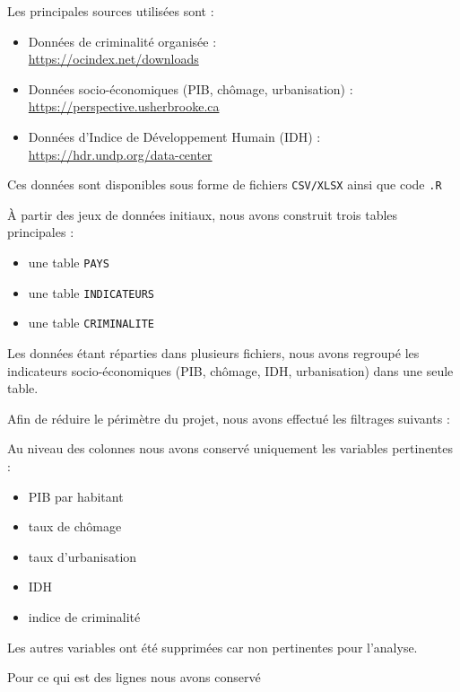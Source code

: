 \documentclass[mstat,12pt]{unswthesis}
\begin{document}
Les principales sources utilisées sont :

\begin{itemize}
\item
  Données de criminalité organisée :\\
  \url{https://ocindex.net/downloads}
\item
  Données socio-économiques (PIB, chômage, urbanisation) :\\
  \url{https://perspective.usherbrooke.ca}
\item
  Données d'Indice de Développement Humain (IDH) :\\
  \url{https://hdr.undp.org/data-center}
\end{itemize}

Ces données sont disponibles sous forme de fichiers \texttt{CSV/XLSX}
ainsi que code \texttt{.R}

\bigskip

À partir des jeux de données initiaux, nous avons construit trois tables
principales :

\begin{itemize}
\item
  une table \texttt{PAYS}
\item
  une table \texttt{INDICATEURS}
\item
  une table \texttt{CRIMINALITE}
\end{itemize}

Les données étant réparties dans plusieurs fichiers, nous avons regroupé
les indicateurs socio-économiques (PIB, chômage, IDH, urbanisation) dans
une seule table.

\bigskip

Afin de réduire le périmètre du projet, nous avons effectué les
filtrages suivants :

\hfill\break
Au niveau des colonnes nous avons conservé uniquement les variables
pertinentes :

\begin{itemize}
\item
  PIB par habitant
\item
  taux de chômage
\item
  taux d'urbanisation
\item
  IDH
\item
  indice de criminalité
\end{itemize}

Les autres variables ont été supprimées car non pertinentes pour
l'analyse.

\hfill\break
Pour ce qui est des lignes nous avons conservé
\end{document}

